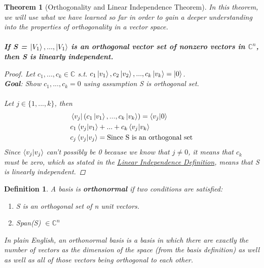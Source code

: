 \documentclass[12pt]{article}
\theoremstyle{plain}
\newtheorem{theorem}[lemma]{Theorem}
\theoremstyle{nonumberplain}
\theoremstyle{plain}
\newtheorem{definition}[lemma]{Definition}
\theoremstyle{nonumberplain}
\newtheorem{proof}{Proof.}
\newcommand\1{{\bf 1}}
\newcommand{\C}{\mathbb{C}} %
\newcommand{\<}{\left\langle}
\renewcommand{\>}{\right\rangle}
\begin{document}
\begin{theorem} [Orthogonality and Linear Independence Theorem]  
In this theorem, we will use what we have learned so far in order to gain a deeper understanding into the properties of orthogonality in a vector space.\\ \\
\textbf{If S = {$\ket{V_1}, ... , \ket{V_1}$} is an orthogonal vector set of nonzero vectors in $\C^n$, then S is linearly independent. } 
\begin{proof}  \renewcommand{\qedsymbol}{}
Let $c_1, ... , c_k \in \C$ s.t. $c_1\ket{v_1}, c_2\ket{v_2}, ... , c_k\ket{v_k} = \ket{0}$.
\\
\textbf{Goal}: Show $c_1, ... , c_k = 0$ using assumption S is orthogonal set.\\
\\
Let $j \in \{1, ... , k\}$, then 
\begin{equation}
\begin{split}
&\bra{v_j}(c_1\ket{v_1}, ... , c_k\ket{v_k}) = \braket{v_j|0}\\
&c_1\braket{v_j|v_1}+ ... + c_k\braket{v_j|v_k}\\
&c_j\braket{v_j|v_j} = \text{Since S is an orthogonal set}
\end{split}
\end{equation}
Since $\braket{v_j|v_j}$ can't possibly be 0 because we know that $j \neq 0$, it means that $c_k$ must be zero, which as stated in the \hyperref[def:Independence]{Linear Independence Definition}, means that S is linearly independent.  
\end{proof}
\end{theorem}

\begin{definition}
A basis is \textbf{orthonormal} if two conditions are satisfied: 
\begin{enumerate} \renewcommand{\blacklozenge}{}
\item S is an orthogonal set of \textit{n} unit vectors.
\item Span(S) $\in \C^n$
\end{enumerate} 
In plain English, an orthonormal basis is a basis in which there are exactly the number of vectors as the dimension of the space (from the basis definition) as well as well as all of those vectors being orthogonal to each other.  
\end{definition}

\pagebreak
\end{document}
